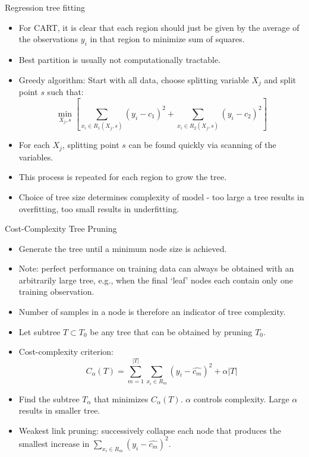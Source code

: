 \documentclass[aspectratio=169]{beamer}
\begin{document}
\begin{frame}{Regression tree fitting}
    \begin{itemize}
        \item For CART, it is clear that each region should just be given by the average of the observations $y_i$ in that region to minimize sum of squares.
        \item Best partition is usually not computationally tractable.
        \item Greedy algorithm: Start with all data, choose splitting variable $X_j$ and split point $s$ such that:
        \begin{equation*}
            \min_{X_j, s} \left[ \sum_{x_i \in R_1(X_j, s)} (y_i - c_1)^2 + \sum_{x_i \in R_2(X_j, s)} (y_i - c_2)^2 \right]
        \end{equation*}
        \item For each $X_j$, splitting point $s$ can be found quickly via scanning of the variables.
        \item This process is repeated for each region to grow the tree.
        \item Choice of tree size determines complexity of model - too large a tree results in overfitting, too small results in underfitting.
    \end{itemize}
\end{frame}


\begin{frame}{Cost-Complexity Tree Pruning}
    \begin{itemize}
        \item Generate the tree until a minimum node size is achieved. 
        \item Note: perfect performance on training data can always be obtained with an arbitrarily large tree, e.g., when the final `leaf' nodes each contain only one training observation.
        \item Number of samples in a node is therefore an indicator of tree complexity.
        \item Let subtree $T \subset T_0$ be any tree that can be obtained by pruning $T_0$.
        \item Cost-complexity criterion:
        \begin{equation*}
            C_{\alpha}(T) = \sum_{m=1}^{|T|} \sum_{x_i \in R_m} (y_i - \hat{c_m})^2 + \alpha |T|
        \end{equation*}
        \item Find the subtree $T_\alpha$ that minimizes $C_{\alpha}(T)$. $\alpha$ controls complexity. Large $\alpha$ results in smaller tree.
        \item Weakest link pruning: successively collapse each node that produces the smallest increase in $\sum_{x_i \in R_m} (y_i - \hat{c_m})^2$.
    \end{itemize}
\end{frame}
\end{document}
